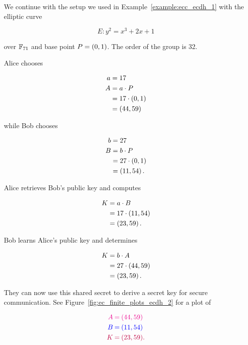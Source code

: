 \begin{example}
\label{example:ecc_ecdh_2}

We continue with the setup we used in Example~\ref{example:ecc_ecdh_1}
with the \gls{elliptic curve}

\begin{equation}
    E: y^{2} = x^{3} + 2x + 1
\end{equation}

\noindent
over $\mathbb{F}_{71}$ and base point $P = \left( 0,1 \right)$.
The order of the \gls{group} is 32.

Alice chooses

\begin{align}
    a &= 17 \nonumber\\
    A &= a\cdot P \nonumber\\
        &= 17\cdot\left( 0,1 \right) \nonumber\\
        &= \left( 44,59 \right)
\end{align}

\noindent
while Bob chooses

\begin{align}
    b &= 27 \nonumber\\
    B &= b\cdot P \nonumber\\
        &= 27\cdot\left( 0,1 \right) \nonumber\\
        &= \left( 11,54 \right).
\end{align}

Alice retrieves Bob's public key and computes

\begin{align}
    K &= a\cdot B \nonumber\\
        &= 17\cdot\left( 11,54 \right) \nonumber\\
        &= \left( 23,59 \right).
\end{align}

\noindent
Bob learns Alice's public key and determines

\begin{align}
    K &= b\cdot A \nonumber\\
        &= 27\cdot\left( 44,59 \right) \nonumber\\
        &= \left( 23,59 \right).
\end{align}

\noindent
They can now use this \gls{shared secret} to derive a secret key
for secure communication.
See Figure~\ref{fig:ec_finite_plots_ecdh_2} for a plot of

\begin{align}
    \color{magenta}{A} &\mathbin{\color{magenta}{=}}
        \color{magenta}{\left( 44, 59 \right)} \nonumber\\
    \color{blue}{B} &\mathbin{\color{blue}{=}}
        \color{blue}{\left( 11,54 \right)} \nonumber\\
    \color{purple}{K} &\mathbin{\color{purple}{=}}
        \color{purple}{\left( 23,59 \right)}.
\end{align}
\end{example}



